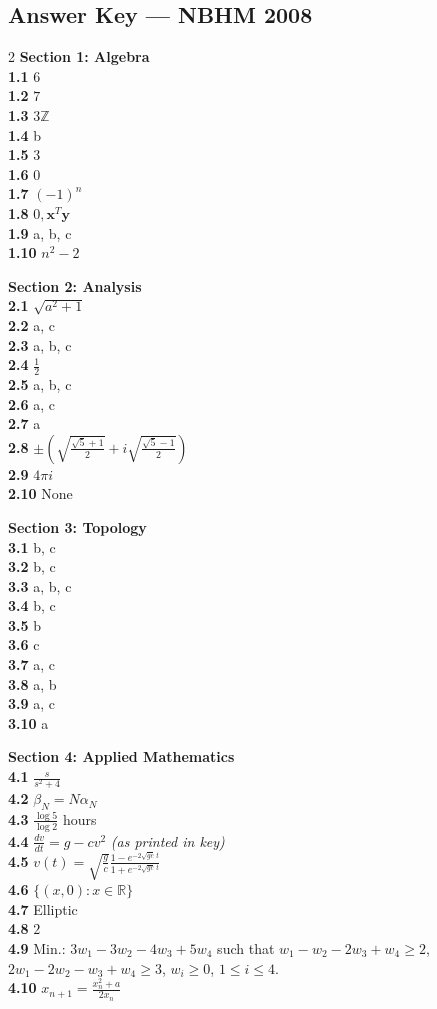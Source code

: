 \documentclass[11pt,a4paper]{article}
\newcommand{\Z}{\mathbb{Z}}
\newcommand{\R}{\mathbb{R}}
\newcommand{\examsec}[1]{%
  \subsection*{#1}
  \vspace{-2pt}
}
\begin{document}
\examsec{Answer Key --- NBHM 2008}
\begin{multicols}{2}
\textbf{Section 1: Algebra}\\
\textbf{1.1} $6$\\
\textbf{1.2} $7$\\
\textbf{1.3} $3\Z$\\
\textbf{1.4} b\\
\textbf{1.5} $3$\\
\textbf{1.6} $0$\\
\textbf{1.7} $(-1)^n$\\
\textbf{1.8} $0, \mathbf{x}^T\mathbf{y}$\\
\textbf{1.9} a, b, c\\
\textbf{1.10} $n^2 - 2$

\medskip
\textbf{Section 2: Analysis}\\
\textbf{2.1} $\sqrt{a^2 + 1}$\\
\textbf{2.2} a, c\\
\textbf{2.3} a, b, c\\
\textbf{2.4} $\frac{1}{2}$\\
\textbf{2.5} a, b, c\\
\textbf{2.6} a, c\\
\textbf{2.7} a\\
\textbf{2.8} $\pm\left(\sqrt{\frac{\sqrt{5}+1}{2}} + i\sqrt{\frac{\sqrt{5}-1}{2}}\right)$\\
\textbf{2.9} $4\pi i$\\
\textbf{2.10} None

\medskip
\textbf{Section 3: Topology}\\
\textbf{3.1} b, c\\
\textbf{3.2} b, c\\
\textbf{3.3} a, b, c\\
\textbf{3.4} b, c\\
\textbf{3.5} b\\
\textbf{3.6} c\\
\textbf{3.7} a, c\\
\textbf{3.8} a, b\\
\textbf{3.9} a, c\\
\textbf{3.10} a

\medskip
\textbf{Section 4: Applied Mathematics}\\
\textbf{4.1} $\frac{s}{s^2+4}$\\
\textbf{4.2} $\beta_N = N\alpha_N$\\
\textbf{4.3} $\frac{\log 5}{\log 2}$ hours\\
\textbf{4.4} $\frac{dv}{dt} = g - cv^2$ \emph{(as printed in key)}\\
\textbf{4.5} $v(t) = \sqrt{\frac{g}{c}}\frac{1 - e^{-2\sqrt{gc}\,t}}{1 + e^{-2\sqrt{gc}\,t}}$\\
\textbf{4.6} $\{(x, 0) : x \in \R\}$\\
\textbf{4.7} Elliptic\\
\textbf{4.8} $2$\\
\textbf{4.9} Min.: $3w_1 - 3w_2 - 4w_3 + 5w_4$ such that $w_1 - w_2 - 2w_3 + w_4 \ge 2$, $2w_1 - 2w_2 - w_3 + w_4 \ge 3$, $w_i \ge 0$, $1 \le i \le 4$.\\
\textbf{4.10} $x_{n+1} = \frac{x_n^2 + a}{2x_n}$


\end{multicols}
\end{document}
